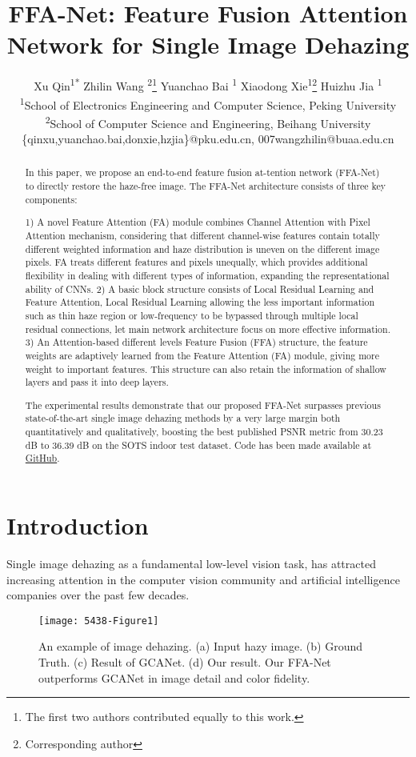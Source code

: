 \documentclass[letterpaper]{article} \usepackage{aaai20}  \usepackage{times}  \usepackage{helvet} \usepackage{courier}  \usepackage[hyphens]{url}  \usepackage{graphicx} \urlstyle{rm} \def\UrlFont{\rm}  \usepackage{graphicx}  \frenchspacing  \setlength{\pdfpagewidth}{8.5in}  \setlength{\pdfpageheight}{11in}  \usepackage{bm}
\title{
	FFA-Net:	Feature Fusion Attention Network for Single Image Dehazing
}
\author{Xu Qin\textsuperscript{\rm 1*}
Zhilin Wang \textsuperscript{\rm 2}\thanks{The first two authors contributed equally to this work.}
Yuanchao Bai \textsuperscript{\rm 1}
Xiaodong Xie\textsuperscript{\rm 1}\thanks{Corresponding author}
Huizhu Jia \textsuperscript{\rm 1}\\ 
\textsuperscript{\rm 1}School of Electronics Engineering and Computer Science, Peking University\\
\textsuperscript{\rm 2}School of Computer Science and Engineering, Beihang University\\
\textrm{
\{qinxu,yuanchao.bai,donxie,hzjia\}@pku.edu.cn, 007wangzhilin@buaa.edu.cn}
}
\begin{document}
\maketitle

\begin{abstract}
In this paper, we propose an end-to-end feature fusion at-tention network (FFA-Net) to directly restore the haze-free image. 
The FFA-Net architecture consists of three  key components:

1) A novel Feature Attention (FA) module combines Channel Attention with Pixel Attention mechanism, considering that  different channel-wise features contain totally different weighted information  and haze distribution is uneven on the different image pixels.
FA treats different features and pixels unequally, which provides additional flexibility in dealing with different types of information, expanding the representational ability of CNNs.
2) A basic block structure consists of Local Residual Learning and Feature Attention, Local Residual Learning allowing the less important information such as thin haze region or low-frequency to be bypassed through multiple local residual connections, let main network architecture focus on more effective information. 
3) An Attention-based different levels Feature Fusion (FFA) structure, the feature weights  are adaptively learned from the Feature Attention (FA) module, giving more weight to important features. This structure can also retain the information of shallow layers and pass it into deep layers.

The experimental results demonstrate that our proposed  FFA-Net surpasses previous state-of-the-art single image dehazing methods by a 
very large margin both quantitatively and qualitatively, boosting the best 
published PSNR metric from 30.23 dB to  36.39 dB on the SOTS indoor test dataset.
 Code has been made available at
\href{https://github.com/zhilin007/FFA-Net}{GitHub}.

\end{abstract}


\section{Introduction}
Single image dehazing as a fundamental low-level vision task, has attracted increasing attention in the computer vision community and artificial intelligence companies over the past few decades.
\begin{figure}[t]
	\centering
	\texttt{[image: 5438-Figure1]} \caption{An example of image dehazing. (a) Input hazy image.  (b) Ground Truth. (c) Result of GCANet. (d) Our result.  Our FFA-Net outperforms GCANet in image detail and color fidelity.}
	\label{fig1}
	
\end{figure}
\end{document}
